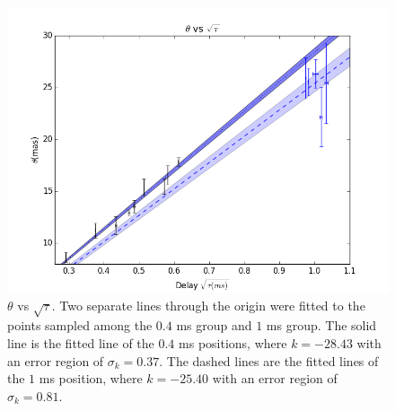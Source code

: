 \documentclass[useAMS,usenatbib]{mn2e}
\begin{document}
\begin{figure}
\centering
\includegraphics[width=1.0\linewidth, angle=0]{Theta_tau.png}
\caption{${\theta}$ vs ${\sqrt{\tau}}$. Two separate lines through the origin were fitted to the points sampled among the $0.4$ ms group and $1$ ms group. The solid line is the fitted line of the $0.4$ ms positions, where $k=-28.43$ with an error region of $\sigma_k=0.37$. The dashed lines are the fitted lines of the $1$ ms position, where $k=-25.40$ with an error region of $\sigma_k=0.81$.
}
\label{thetatau}
\end{figure}
\end{document}
